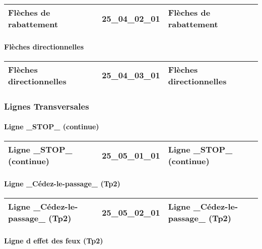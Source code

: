 \documentclass[12pt,titlepage]{book}
\begin{document}
\renewcommand{\arraystretch}{1.2}
\begin{supertabular}{|p{10cm}|c|p{15cm}|}
 Flèches de rabattement & 25\_04\_02\_01 & Flèches de rabattement\\
\hline
\end{supertabular}


\paragraph{Flèches directionnelles}
\noindent
\vspace{\baselineskip}

\renewcommand{\arraystretch}{1.2}
\begin{supertabular}{|p{10cm}|c|p{15cm}|}
 Flèches directionnelles & 25\_04\_03\_01 & Flèches directionnelles\\
\hline
\end{supertabular}

\subsubsection{\large Lignes Transversales}
\paragraph{Ligne \_STOP\_ (continue)}
\noindent
\vspace{\baselineskip}

\renewcommand{\arraystretch}{1.2}
\begin{supertabular}{|p{10cm}|c|p{15cm}|}
 Ligne \_STOP\_ (continue) & 25\_05\_01\_01 & Ligne \_STOP\_ (continue)\\
\hline
\end{supertabular}


\paragraph{Ligne \_Cédez-le-passage\_ (Tp2)}
\noindent
\vspace{\baselineskip}

\renewcommand{\arraystretch}{1.2}
\begin{supertabular}{|p{10cm}|c|p{15cm}|}
 Ligne \_Cédez-le-passage\_ (Tp2) & 25\_05\_02\_01 & Ligne \_Cédez-le-passage\_ (Tp2)\\
\hline
\end{supertabular}


\paragraph{Ligne d effet des feux (Tp2)}
\noindent
\vspace{\baselineskip}
\end{document}
